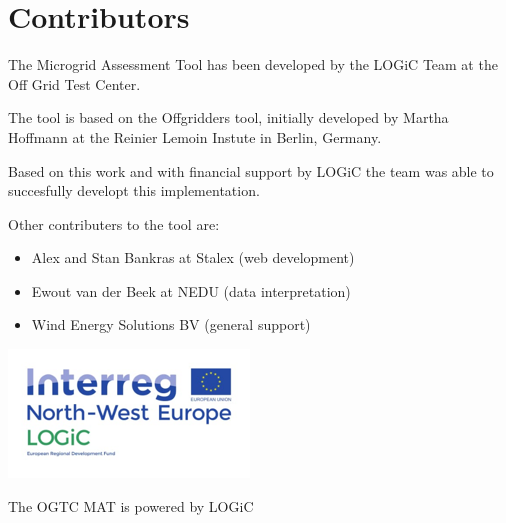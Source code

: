 \documentclass{article}[11pt]
\begin{document}
\begin{multicols}{2}
\begin{center}
\end{center}








\end{multicols}\section*{Contributors}\begin{multicols}{2}\setlength{\parindent}{0pt}

The Microgrid Assessment Tool has been developed by the LOGiC Team at the Off Grid Test Center. 

The tool is based on the Offgridders tool, initially developed by Martha Hoffmann at the Reinier Lemoin Instute in Berlin, Germany. 

Based on this work and with financial support by LOGiC the team was able to succesfully developt this implementation. 

Other contributers to the tool are: 

\begin{itemize}

\item Alex and Stan Bankras at Stalex (web development)

\item Ewout van der Beek at NEDU (data interpretation)

\item Wind Energy Solutions BV (general support)

\end{itemize}

\vfill

\begin{center}

\includegraphics[width=\linewidth]{logiclogo.png}

\end{center}

\centering \small{The OGTC MAT is powered by LOGiC}

\end{multicols}
\end{document}
